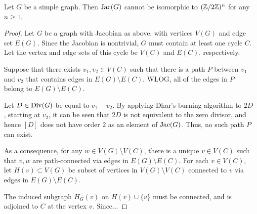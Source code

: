 \documentclass{article}
\begin{document}
\begin{prop}
  Let $G$ be a simple graph. Then $\operatorname{Jac}(G)$ cannot be isomorphic to
  $(\mathbb{Z}/2\mathbb{Z})^n$ for any $n \ge 1$. 
\end{prop}
\begin{proof}
  Let $G$ be a graph with Jacobian as above, with vertices $V(G)$ and
  edge set $E(G)$.  Since the Jacobian is nontrivial, $G$ must contain
  at least one cycle $C$. Let the vertex and edge sets of this cycle
  be $V(C)$ and $E(C)$, respectively.

  Suppose that there exists $v_1, v_2 \in V(C)$ such that there is a
  path $P$ between $v_1$ and $v_2$ that contains edges in $E(G)
  \setminus E(C)$.  WLOG, all of the edges in $P$ belong to $E(G)
  \setminus E(C)$.

  Let $D \in \operatorname{Div}(G)$ be equal to $v_1 - v_2$. By applying Dhar's
  burning algorithm to $2D$, starting at $v_2$, it can be seen that
  $2D$ is not equivalent to the zero divisor, and hence $[D]$ does not
  have order $2$ as an element of $\operatorname{Jac}(G)$. Thus, no such path $P$
  can exist.

  As a consequence, for any $w \in V(G) \setminus V(C)$, there is a
  unique $v \in V(C)$ such that $v,w$ are path-connected via edges in
  $E(G) \setminus E(C)$. For each $v \in V(C)$, let $H(v) \subset
  V(G)$ be subset of vertices in $V(G) \setminus V(C)$ connected to
  $v$ via edges in $E(G) \setminus E(C)$. 

  The induced subgraph $H_G(v)$ on $H(v) \cup \{v\}$ must be
  connected, and is adjoined to $C$ at the vertex $v$. Since...

\end{proof}
\end{document}
